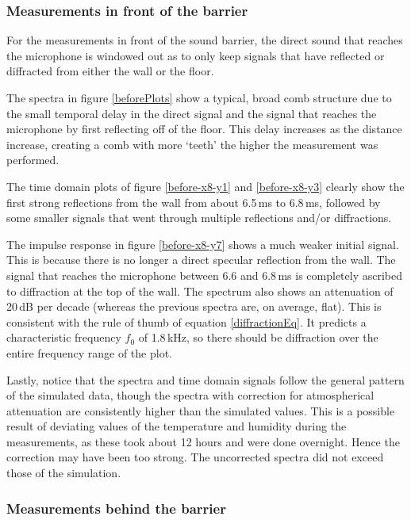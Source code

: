 \subsubsection*{Measurements in front of the barrier}

For the measurements in front of the sound barrier, the direct sound that reaches the microphone is windowed out as to only keep signals that have reflected or diffracted from either the wall or the floor.

The spectra in figure \ref{beforePlots} show a typical, broad comb structure due to the small temporal delay in the direct signal and the signal that reaches the microphone by first reflecting off of the floor. This delay increases as the distance increase, creating a comb with more `teeth' the higher the measurement was performed.

The time domain plots of figure \ref{before-x8-y1} and \ref{before-x8-y3} clearly show the first strong reflections from the wall from about 6.5\,ms to 6.8\,ms, followed by some smaller signals that went through multiple reflections and/or diffractions.

The impulse response in figure \ref{before-x8-y7} shows a much weaker initial signal. This is because there is no longer a direct specular reflection from the wall. The signal that reaches the microphone between 6.6 and 6.8\,ms is completely ascribed to diffraction at the top of the wall. The spectrum also shows an attenuation of 20\,dB per decade (whereas the previous spectra are, on average, flat). This is consistent with the rule of thumb of equation \ref{diffractionEq}. It predicts a characteristic frequency $f_0$ of 1.8\,kHz, so there should be diffraction over the entire frequency range of the plot.

Lastly, notice that the spectra and time domain signals follow the general pattern of the simulated data, though the spectra with correction for atmospherical attenuation are consistently higher than the simulated values. This is a possible result of deviating values of the temperature and humidity during the measurements, as these took about 12 hours and were done overnight. Hence the correction may have been too strong. The uncorrected spectra did not exceed those of the simulation.



\subsubsection*{Measurements behind the barrier}

